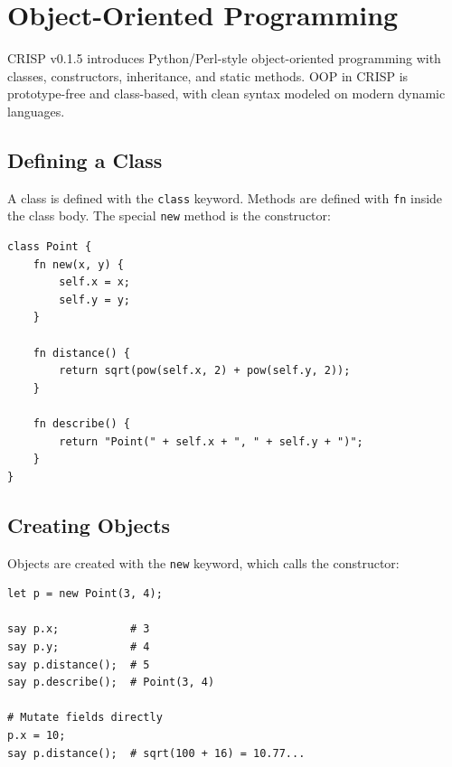 \section{Object-Oriented Programming}

CRISP v0.1.5 introduces Python/Perl-style object-oriented programming with classes, constructors, inheritance, and static methods. OOP in CRISP is prototype-free and class-based, with clean syntax modeled on modern dynamic languages.

\subsection{Defining a Class}

A class is defined with the \texttt{class} keyword. Methods are defined with \texttt{fn} inside the class body. The special \texttt{new} method is the constructor:

\begin{tcolorbox}[colback=codebg, colframe=darkpurple, colbacktitle=darkpurple, title=\textbf{\textcolor{codegold}{Class Definition}}, fonttitle=\bfseries, sharp corners]
\begin{lstlisting}
class Point {
    fn new(x, y) {
        self.x = x;
        self.y = y;
    }

    fn distance() {
        return sqrt(pow(self.x, 2) + pow(self.y, 2));
    }

    fn describe() {
        return "Point(" + self.x + ", " + self.y + ")";
    }
}
\end{lstlisting}
\end{tcolorbox}

\subsection{Creating Objects}

Objects are created with the \texttt{new} keyword, which calls the constructor:

\begin{tcolorbox}[colback=codebg, colframe=darkpurple, colbacktitle=darkpurple, title=\textbf{\textcolor{codegold}{Creating Objects}}, fonttitle=\bfseries, sharp corners]
\begin{lstlisting}
let p = new Point(3, 4);

say p.x;           # 3
say p.y;           # 4
say p.distance();  # 5
say p.describe();  # Point(3, 4)

# Mutate fields directly
p.x = 10;
say p.distance();  # sqrt(100 + 16) = 10.77...
\end{lstlisting}
\end{tcolorbox}

